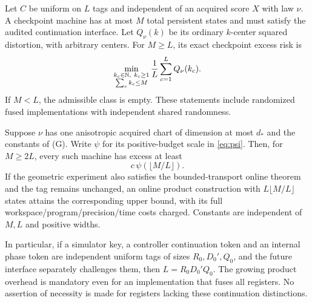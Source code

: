 \begin{theorem}\label{thm:tag}
Let $C$ be uniform on $L$ tags and independent of an acquired score $X$ with law $\nu$. A checkpoint machine has at most $M$ total persistent states and must satisfy the audited continuation interface. Let $Q_\nu(k)$ be its ordinary $k$-center squared distortion, with arbitrary centers. For $M\ge L$, its exact checkpoint excess risk is
\begin{equation}\label{eq:tag-exact}
 \min_{\substack{k_c\in\mathbb N,\ k_c\ge1\\\sum_c k_c\le M}}
       \frac1L\sum_{c=1}^L Q_\nu(k_c).
\end{equation}
If $M<L$, the admissible class is empty. These statements include randomized fused implementations with independent shared randomness.

Suppose $\nu$ has one anisotropic acquired chart of dimension at most $d_*$ and the constants of \textup{(G)}. Write $\psi$ for its positive-budget scale in \eqref{eq:psi}. Then, for $M\ge2L$, every such machine has excess at least
\begin{equation}\label{eq:tag-lower}
 c\,\psi(\lfloor M/L\rfloor).
\end{equation}
If the geometric experiment also satisfies the bounded-transport online theorem and the tag remains unchanged, an online product construction with $L\lfloor M/L\rfloor$ states attains the corresponding upper bound, with its full workspace/program/precision/time costs charged. Constants are independent of $M,L$ and positive widths.

In particular, if a simulator key, a controller continuation token and an internal phase token are independent uniform tags of sizes $R_0,D_0',Q_0$, and the future interface separately challenges them, then $L=R_0D_0'Q_0$. The growing product overhead is mandatory even for an implementation that fuses all registers. No assertion of necessity is made for registers lacking these continuation distinctions.
\end{theorem}
